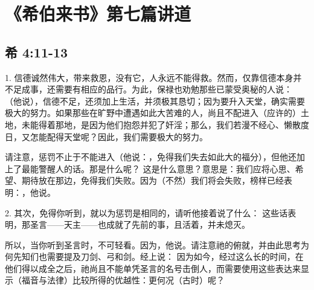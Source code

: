 

\section{《希伯来书》第七篇讲道}


\subsection{希 4:11-13}

\par

1. 信德诚然伟大，带来救恩，没有它，人永远不能得救。然而，仅靠信德本身并不足成事，还需要有相应的品行。为此，保禄也劝勉那些已蒙受奥秘的人说： （他说），信德不足，还须加上生活，并须极其恳切；因为要升入天堂，确实需要极大的努力。如果那些在旷野中遭遇如此大苦难的人，尚且不配进入（应许的）土地，未能得着那地，是因为他们抱怨并犯了奸淫；那么，我们若漫不经心、懒散度日，又怎能配得天堂呢？因此，我们需要极大的努力。\par

请注意，惩罚不止于不能进入（他说：，免得我们失去如此大的福分），但他还加上了最能警醒人的话。那是什么呢？ 这是什么意思？意思是：我们应将心思、希望、期待放在那边，免得我们失败。因为（不然）我们将会失败，榜样已经表明：，他说。\par

2. 其次，免得你听到，就以为惩罚是相同的，请听他接着说了什么： 这些话表明，那圣言——天主——也成就了先前的事，且活着，并未熄灭。\par

所以，当你听到圣言时，不可轻看。因为，他说。请注意祂的俯就，并由此思考为何先知们也需要提及刀剑、弓和剑。经上说：  因为如今，经过这么长的时间，在他们得以成全之后，祂尚且不能单凭圣言的名号击倒人，而需要使用这些表达来显示（福音与法律）比较所得的优越性：更何况（古时）呢？\par


